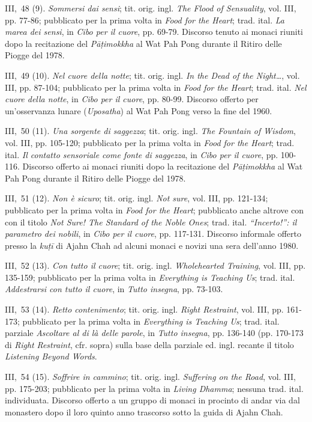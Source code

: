 III,~48 (9). \emph{Sommersi dai sensi}; tit. orig. ingl. \emph{The Flood
of Sensuality}, vol. III, pp. 77-86; pubblicato per la prima volta in
\emph{Food for the Heart}; trad. ital. \emph{La marea dei sensi}, in
\emph{Cibo per il cuore}, pp. 69-79. Discorso tenuto ai monaci riuniti
dopo la recitazione del \emph{Pāṭimokkha} al Wat Pah Pong durante il
Ritiro delle Piogge del 1978.

III,~49 (10). \emph{Nel cuore della notte}; tit. orig. ingl. \emph{In
the Dead of the Night\ldots{}}, vol. III, pp. 87-104; pubblicato per la prima
volta in \emph{Food for the Heart}; trad. ital. \emph{Nel cuore della
notte}, in \emph{Cibo per il cuore}, pp. 80-99. Discorso offerto per
un'osservanza lunare (\emph{Uposatha}) al Wat Pah Pong verso la fine del
1960.

III,~50 (11). \emph{Una sorgente di saggezza}; tit. orig. ingl.
\emph{The Fountain of Wisdom}, vol. III, pp. 105-120; pubblicato per la
prima volta in \emph{Food for the Heart}; trad. ital. \emph{Il contatto
sensoriale come fonte di saggezza}, in \emph{Cibo per il cuore}, pp.
100-116. Discorso offerto ai monaci riuniti dopo la recitazione del
\emph{Pāṭimokkha} al Wat Pah Pong durante il Ritiro delle Piogge del
1978.

III,~51 (12). \emph{Non è sicuro}; tit. orig. ingl. \emph{Not sure},
vol. III, pp. 121-134; pubblicato per la prima volta in \emph{Food for
the Heart}; pubblicato anche altrove con con il titolo \emph{Not Sure!
The Standard of the Noble Ones}; trad. ital. \emph{``Incerto!'': il
parametro dei nobili}, in \emph{Cibo per il cuore}, pp. 117-131.
Discorso informale offerto presso la \emph{kuṭī} di Ajahn Chah ad alcuni
monaci e novizi una sera dell'anno 1980.

III,~52 (13). \emph{Con tutto il cuore}; tit. orig. ingl.
\emph{Wholehearted Training}, vol. III, pp. 135-159; pubblicato per la
prima volta in \emph{Everything is Teaching Us}; trad. ital.
\emph{Addestrarsi con tutto il cuore}, in \emph{Tutto insegna}, pp.
73-103.

III,~53 (14). \emph{Retto contenimento}; tit. orig. ingl. \emph{Right
Restraint}, vol. III, pp. 161-173; pubblicato per la prima volta in
\emph{Everything is Teaching Us}; trad. ital. parziale \emph{Ascoltare
al di là delle parole}, in \emph{Tutto insegna}, pp. 136-140 (pp.
170-173 di \emph{Right} \emph{Restraint}, cfr. sopra) sulla base della
parziale ed. ingl. recante il titolo \emph{Listening Beyond Words}.

III,~54 (15). \emph{Soffrire in cammino}; tit. orig. ingl.
\emph{Suffering on the Road}, vol. III, pp. 175-203; pubblicato per la
prima volta in \emph{Living Dhamma}; nessuna trad. ital. individuata.
Discorso offerto a un gruppo di monaci in procinto di andar via dal
monastero dopo il loro quinto anno trascorso sotto la guida di Ajahn
Chah.

